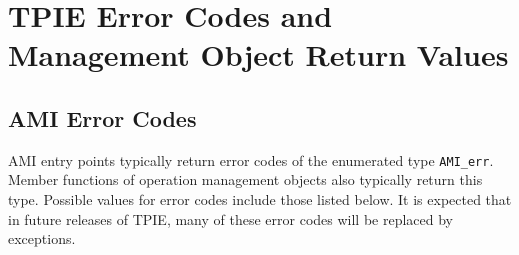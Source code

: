 \chapter{TPIE Error Codes and Management Object Return Values}


\section{AMI Error Codes}
\label{sec:ami-errors}


AMI entry points typically return error codes of the enumerated type
\lstinline|AMI_err|.  Member functions of operation management
objects also typically return this
type.  Possible values for error codes include those listed below.  It
is expected that in future releases of TPIE, many of these error codes
will be replaced by exceptions.

